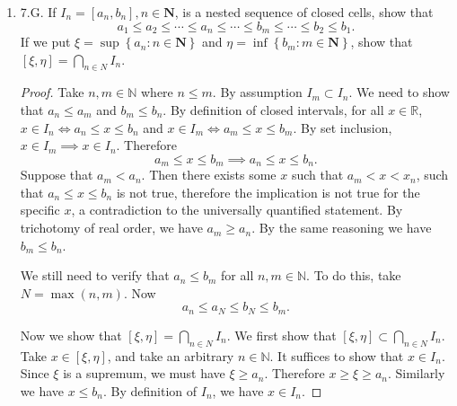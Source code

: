 \begin{enumerate}
\begin{proof}
	Now we show there is no common point. Fix any $x \in J_1 = (0,1)$. By Corollary 6.7(b), there exists some $n \in \mathbb{N}$ such that $0<\frac{1}{n}<x$. In other words, $x \not\in J_n$. Therefore, $\bigcap_{n \in \mathbb{N}} J_n = \emptyset $ since each element is not in at least one of the sets.
\end{proof}
	\item 7.G. If $I_{n}=\left[a_{n}, b_{n}\right], n \in \mathbf{N}$, is a nested sequence of closed cells, show that
\[
a_{1} \leq a_{2} \leq \cdots \leq a_{n} \leq \cdots \leq b_{m} \leq \cdots \leq b_{2} \leq b_{1} .
\]
If we put $\xi=\sup \left\{a_{n}: n \in \mathbf{N}\right\}$ and $\eta=\inf \left\{b_{m}: m \in \mathbf{N}\right\}$, show that $[\xi, \eta]=\bigcap_{n \in N} I_{n}$.
\begin{proof}
	Take $n, m \in \mathbb{N}$ where $n\le m$. By assumption $I_m \subset  I_n$. We need to show that $a_n \le a_m$ and $b_m\le b_n$. By definition of closed intervals, for all  $x \in \mathbb{R}$, $x \in I_n \iff a_n \le  x \le  b_n$ and $x \in I_m \iff a_m \le  x \le  b_m$. By set inclusion, $x \in I_m \implies x \in I_n$. Therefore \[
	a_m \le  x \le  b_m \implies a_n \le  x \le  b_n
	.\] 
Suppose that $a_m < a_n$. Then there exists some $x$ such that $a_m < x < x_n$, such that $a_n \le x\le b_n$ is not true, therefore the implication is not true for the specific $x$, a contradiction to the universally quantified statement. By trichotomy of real order, we have $a_m \ge a_n$. By the same reasoning we have $b_m \le  b_n$.

\begin{correction}
	We still need to verify that $a_n\le  b_m$ for all $n, m \in  \mathbb{N}$. To do this, take $N = \max(n,m)$. Now \[
		a_n \le a_N \le b_N \le b_m
	.\] 
\end{correction}
Now we show that $[\xi, \eta]=\bigcap_{n \in N} I_{n}$. We first show that $[\xi, \eta]\subset \bigcap_{n \in N} I_{n}$. Take $x \in  \left[ \xi, \eta \right] $, and take an arbitrary $n \in \mathbb{N}$. It suffices to show that $x \in I_n$. Since $\xi$ is a supremum, we must have $\xi \ge a_n$. Therefore $x \ge  \xi \ge  a_n$. Similarly we have $x \le  b_n$. By definition of $I_n$, we have $x \in  I_n$.


\end{proof}
\end{enumerate}
